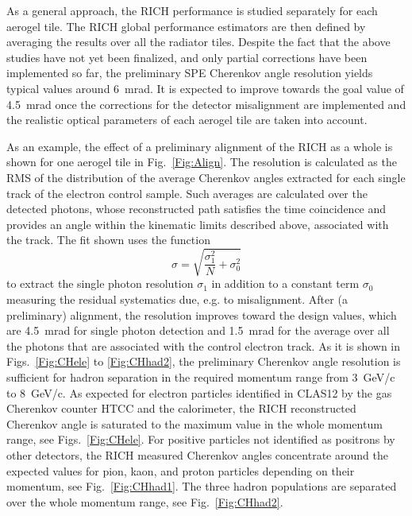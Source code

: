 \documentclass[5p,times,twocolumn]{elsarticle}
\begin{document}
As a general approach, the RICH performance is studied separately for each aerogel tile.
The RICH global performance estimators are then defined by averaging the results over all the
radiator tiles. 
Despite the fact that the above studies have not yet been finalized, and only partial corrections have been
implemented so far, the preliminary SPE Cherenkov angle resolution yields typical values around 6~mrad. It is expected to improve
towards the goal value of 4.5~mrad once the corrections for the detector misalignment are implemented and the
realistic optical parameters of each aerogel tile are taken into account.

As an example, the effect of a preliminary
alignment of the RICH as a whole is shown for one aerogel tile in Fig.~\ref{Fig:Align}. The
resolution is calculated as the RMS of the distribution of the average Cherenkov angles extracted for 
each single track of the electron control sample. Such averages are calculated 
over the detected photons, whose reconstructed path satisfies the time coincidence and provides an angle within the 
kinematic limits described above, associated with the track. The fit shown uses the function
$$\sigma = \sqrt{\frac{\sigma_1^2}{N}+\sigma_0^2}$$ to extract the single photon resolution $\sigma_1$ in addition to
a constant term $\sigma_0$ measuring the residual systematics due, e.g. to misalignment.
After (a preliminary) alignment, the resolution improves toward
the design values, which are 4.5~mrad for single photon detection and 1.5~mrad for the average over all the photons 
that are associated with the control electron track. 
As it is shown in Figs.~\ref{Fig:CHele} to \ref{Fig:CHhad2}, the preliminary Cherenkov angle resolution is sufficient 
for hadron separation in the required momentum range from 3~GeV/c to 8~GeV/c. As expected for electron particles identified in CLAS12
by the gas Cherenkov counter HTCC and the calorimeter, the RICH reconstructed Cherenkov angle is saturated to the 
maximum value in the whole momentum range, see Figs.~\ref{Fig:CHele}. For positive particles not identified as positrons
by other detectors, the RICH measured Cherenkov angles concentrate around the expected values for pion, kaon, and proton particles  
depending on their momentum, see Fig.~\ref{Fig:CHhad1}. The three hadron populations are separated over the whole momentum 
range, see Fig.~\ref{Fig:CHhad2}.
\end{document}
